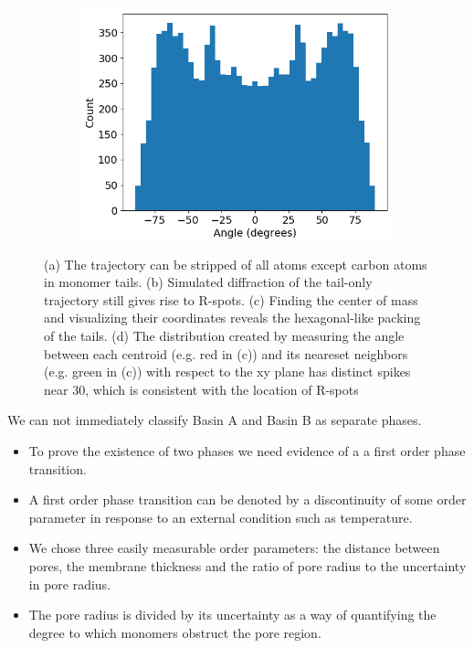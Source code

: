 \documentclass{article}
\begin{document}
\begin{figure}[!ht]
\begin{subfigure}{0.45\textwidth}
		\caption{}\label{fig:centroids}
	\end{subfigure}
	\begin{subfigure}{0.45\textwidth}
		\centering
		\includegraphics[width=\textwidth]{angles_traj_layered.png}
		\caption{}\label{fig:angle_distribution}
	\end{subfigure}
	\caption{(a) The trajectory can be stripped of all atoms except carbon
	atoms in monomer tails. (b) Simulated diffraction of the tail-only trajectory
	still gives rise to R-spots. (c) Finding the center of mass and visualizing 
	their coordinates reveals the hexagonal-like packing of the tails. (d) The 
	distribution created by measuring the angle between each centroid (e.g. red 
	in (c)) and its neareset neighbors (e.g. green in (c)) with respect to the xy
	plane has distinct spikes near 30\degree, which is consistent with the location
	of R-spots}\label{fig:tail_packing}
  \end{figure}
  We can not immediately classify Basin A and Basin B as separate phases.
  \begin{itemize}
	\item To prove the existence of two phases we need evidence of a
	a first order phase transition.
	\item A first order phase transition can be denoted by a discontinuity
        of some order parameter in response to an external condition such as
	temperature.
	\item We chose three easily measurable order parameters: the distance
	between pores, the membrane thickness and the ratio of pore radius to
	the uncertainty in pore radius.  %
        \item The pore radius is divided by its uncertainty as a way of quantifying
        the degree to which monomers obstruct the pore region.
  \end{itemize}
\end{document}
